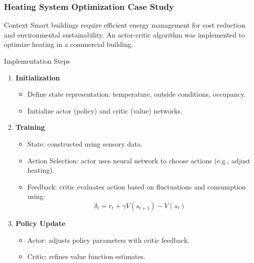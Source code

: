 \documentclass[aspectratio=169]{beamer}
\begin{document}
\begin{frame}[fragile]
    \frametitle{Heating System Optimization Case Study}
    \begin{block}{Context}
        Smart buildings require efficient energy management for cost reduction and environmental sustainability. 
        An actor-critic algorithm was implemented to optimize heating in a commercial building.
    \end{block}
    
    \begin{block}{Implementation Steps}
        \begin{enumerate}
            \item \textbf{Initialization}
                \begin{itemize}
                    \item Define state representation: temperature, outside conditions, occupancy.
                    \item Initialize actor (policy) and critic (value) networks.
                \end{itemize}
            \item \textbf{Training}
                \begin{itemize}
                    \item State: constructed using sensory data.
                    \item Action Selection: actor uses neural network to choose actions (e.g., adjust heating).
                    \item Feedback: critic evaluates action based on fluctuations and consumption using:
                    \begin{equation}
                        \delta_t = r_t + \gamma V(s_{t+1}) - V(s_t)
                    \end{equation}
                \end{itemize}
            \item \textbf{Policy Update}
                \begin{itemize}
                    \item Actor: adjusts policy parameters with critic feedback.
                    \item Critic: refines value function estimates.
                \end{itemize}
        \end{enumerate}
    \end{block}
\end{frame}
\end{document}
